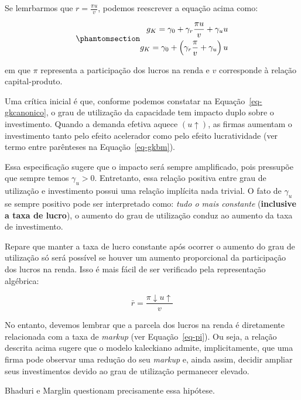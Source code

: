 \documentclass[
  brazilian,
  letterpaper,
  DIV=11,
  numbers=noendperiod]{scrreprt}
\begin{document}
Se lemrbarmos que \(r=\frac{\pi u}{v}\), podemos reescrever a equação
acima como:

\begin{equation}\protect\phantomsection\label{eq-gkcanonico}{\begin{aligned}
g_K=\gamma_0 + \gamma_r \frac{\pi u}{v} + \gamma_u u \\
g_K = \gamma_0 + \left(\gamma_r \frac{\pi}{v}+\gamma_u \right) u
\end{aligned}}\end{equation}

em que \(\pi\) representa a participação dos lucros na renda e \(v\)
corresponde à relação capital-produto.

Uma crítica inicial é que, conforme podemos constatar na
Equação~\ref{eq-gkcanonico}, o grau de utilização da capacidade tem
impacto duplo sobre o investimento. Quando a demanda efetiva aquece
\((u\uparrow)\), as firmas aumentam o investimento tanto pelo efeito
acelerador como pelo efeito lucratividade (ver termo entre parênteses na
Equação~\ref{eq-gkbm}).

Essa especificação sugere que o impacto será sempre amplificado, pois
pressupõe que sempre temos \(\gamma_u > 0\). Entretanto, essa relação
positiva entre grau de utilização e investimento possui uma relação
implícita nada trivial. O fato de \(\gamma_u\) se sempre positivo pode
ser interpretado como: \emph{tudo o mais constante} (\textbf{inclusive a
taxa de lucro}), o aumento do grau de utilização conduz ao aumento da
taxa de investimento.

Repare que manter a taxa de lucro constante após ocorrer o aumento do
grau de utilização só será possível se houver um aumento proporcional da
participação dos lucros na renda. Isso é mais fácil de ser verificado
pela representação algébrica:

\[\bar{r} = \frac{\pi \downarrow u\uparrow}{v}\]

No entanto, devemos lembrar que a parcela dos lucros na renda é
diretamente relacionada com a taxa de \emph{markup} (ver
Equação~\ref{eq-pi}). Ou seja, a relação descrita acima sugere que o
modelo kaleckiano admite, implicitamente, que uma firma pode observar
uma redução do seu \emph{markup} e, ainda assim, decidir ampliar seus
investimentos devido ao grau de utilização permanecer elevado.

Bhaduri e Marglin questionam precisamente essa hipótese.
\end{document}
